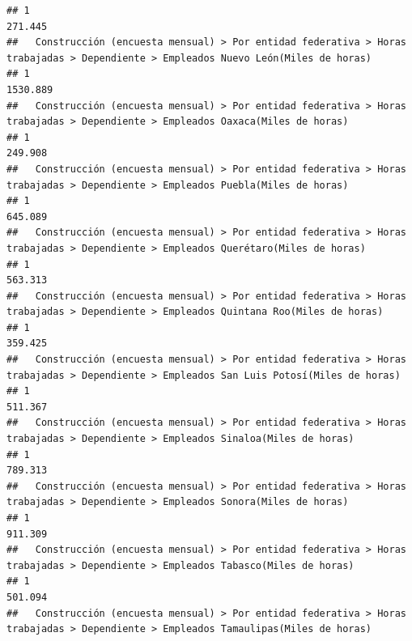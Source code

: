 \documentclass[
]{article}
\begin{document}
\begin{verbatim}
## 1                                                                                                                        271.445
##   Construcción (encuesta mensual) > Por entidad federativa > Horas trabajadas > Dependiente > Empleados Nuevo León(Miles de horas) 
## 1                                                                                                                          1530.889
##   Construcción (encuesta mensual) > Por entidad federativa > Horas trabajadas > Dependiente > Empleados Oaxaca(Miles de horas) 
## 1                                                                                                                       249.908
##   Construcción (encuesta mensual) > Por entidad federativa > Horas trabajadas > Dependiente > Empleados Puebla(Miles de horas) 
## 1                                                                                                                       645.089
##   Construcción (encuesta mensual) > Por entidad federativa > Horas trabajadas > Dependiente > Empleados Querétaro(Miles de horas) 
## 1                                                                                                                          563.313
##   Construcción (encuesta mensual) > Por entidad federativa > Horas trabajadas > Dependiente > Empleados Quintana Roo(Miles de horas) 
## 1                                                                                                                             359.425
##   Construcción (encuesta mensual) > Por entidad federativa > Horas trabajadas > Dependiente > Empleados San Luis Potosí(Miles de horas) 
## 1                                                                                                                                511.367
##   Construcción (encuesta mensual) > Por entidad federativa > Horas trabajadas > Dependiente > Empleados Sinaloa(Miles de horas) 
## 1                                                                                                                        789.313
##   Construcción (encuesta mensual) > Por entidad federativa > Horas trabajadas > Dependiente > Empleados Sonora(Miles de horas) 
## 1                                                                                                                       911.309
##   Construcción (encuesta mensual) > Por entidad federativa > Horas trabajadas > Dependiente > Empleados Tabasco(Miles de horas) 
## 1                                                                                                                        501.094
##   Construcción (encuesta mensual) > Por entidad federativa > Horas trabajadas > Dependiente > Empleados Tamaulipas(Miles de horas) 

\end{verbatim}
\end{document}
